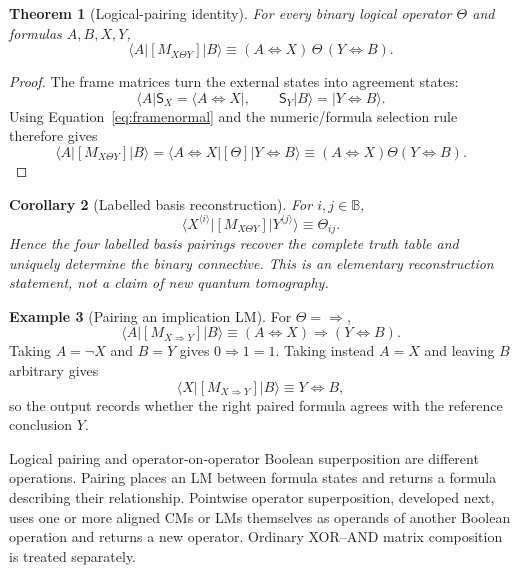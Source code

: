 \documentclass[11pt]{article}
\newtheorem{theorem}{Theorem}[section]
\newtheorem{corollary}[theorem]{Corollary}
\theoremstyle{definition}
\newtheorem{example}[theorem]{Example}
\theoremstyle{remark}
\newcommand{\B}{\mathbb B}
\begin{document}
\begin{theorem}[Logical-pairing identity]
For every binary logical operator $\Theta$ and formulas $A,B,X,Y$,
\begin{equation}
 \langle A|[M_{X\Theta Y}]|B\rangle
 \equiv (A\Leftrightarrow X)\,\Theta\,(Y\Leftrightarrow B).
 \label{eq:binarypairing}
\end{equation}
\end{theorem}
\begin{proof}
The frame matrices turn the external states into agreement states:
\[
 \langle A|\mathsf S_X=\langle A\Leftrightarrow X|,
 \qquad
 \mathsf S_Y|B\rangle=|Y\Leftrightarrow B\rangle.
\]
Using Equation~\eqref{eq:framenormal} and the numeric/formula selection rule therefore gives
\[
 \langle A|[M_{X\Theta Y}]|B\rangle
 =\langle A\Leftrightarrow X|[\Theta]|Y\Leftrightarrow B\rangle
 \equiv (A\Leftrightarrow X)\Theta(Y\Leftrightarrow B).
\]
\end{proof}

\begin{corollary}[Labelled basis reconstruction]
\label{cor:basisreconstruction}
For $i,j\in\B$,
\begin{equation}
 \langle X^{\langle i\rangle}|[M_{X\Theta Y}]|Y^{\langle j\rangle}\rangle
 \equiv \Theta_{ij}.
 \label{eq:basisreconstruction}
\end{equation}
Hence the four labelled basis pairings recover the complete truth table and uniquely determine the binary connective.  This is an elementary reconstruction statement, not a claim of new quantum tomography.
\end{corollary}

\begin{example}[Pairing an implication LM]
For $\Theta=\Rightarrow$,
\[
 \langle A|[M_{X\Rightarrow Y}]|B\rangle
 \equiv (A\Leftrightarrow X)\Rightarrow(Y\Leftrightarrow B).
\]
Taking $A=\neg X$ and $B=Y$ gives $0\Rightarrow1=1$.  Taking instead $A=X$ and leaving $B$ arbitrary gives
\[
 \langle X|[M_{X\Rightarrow Y}]|B\rangle
 \equiv Y\Leftrightarrow B,
\]
so the output records whether the right paired formula agrees with the reference conclusion $Y$.
\end{example}

Logical pairing and operator-on-operator Boolean superposition are different operations.  Pairing places an LM between formula states and returns a formula describing their relationship.  Pointwise operator superposition, developed next, uses one or more aligned CMs or LMs themselves as operands of another Boolean operation and returns a new operator.  Ordinary XOR--AND matrix composition is treated separately.
\end{document}
